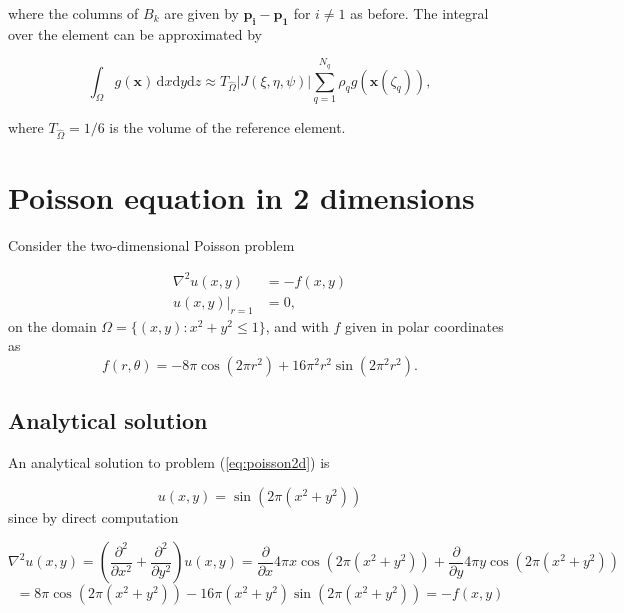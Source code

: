 \documentclass[paper=a4, fontsize=11pt]{scrartcl} %
\begin{document}
where the columns of $B_k$ are given by $\mathbf{p_i}-\mathbf{p_1}$ for $i\neq1$ as before. The integral over the element can be approximated by

\[ \int_{\Omega} \! g(\mathbf{x}) \, \mathrm{d}x\mathrm{d}y\mathrm{d}z  \approx T_{\hat{\Omega}} |J(\xi,\eta,\psi)| \sum_{q=1}^{N_q} \rho_{q}g(\mathbf{x}(\zeta_q)),
\]

where $T_{\hat{\Omega}}=1/6$ is the volume of the reference element.

\section{Poisson equation in 2 dimensions}

Consider the two-dimensional Poisson problem

\begin{equation}
\begin{aligned}
\nabla^2u(x,y) 	&= -f(x,y) \\
u(x,y)|_{r=1} 	&= 0,
\end{aligned}
\label{eq:poisson2d}
\end{equation}
on the domain $\Omega = \{(x,y) : x^2+y^2\leq 1\}$, and with $f$ given in polar coordinates as
\[ f(r,\theta)= -8\pi \cos(2\pi r^2)+16\pi^2r^2\sin(2\pi^2 r^2).\]

\subsection{Analytical solution}
An analytical solution to problem (\ref{eq:poisson2d}) is 

\begin{equation}
u(x,y)=\sin\left(2\pi(x^2+y^2)\right)
\label{eq:poisson2danal}
\end{equation}
since by direct computation

\[\nabla^2u(x,y) = \left( \frac{\partial^2}{\partial x^2} + \frac{\partial^2}{\partial y^2} \right) u(x,y) = \frac{\partial}{\partial x} 4\pi x\cos\left(2\pi(x^2+y^2)\right) + \frac{\partial}{\partial y} 4\pi y\cos\left(2\pi(x^2+y^2)\right)
\]\[= 8\pi\cos\left(2\pi(x^2+y^2)\right) -16\pi(x^2+y^2)\sin\left(2\pi(x^2+y^2)\right) = -f(x,y)\]
\end{document}
